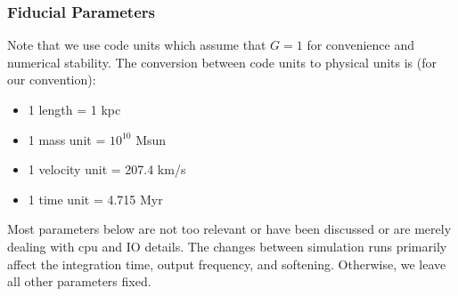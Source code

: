 \subsubsection{Fiducial Parameters}\label{fiducial-parameters}

Note that we use code units which assume that \(G=1\) for convenience
and numerical stability. The conversion between code units to physical
units is (for our convention):

\begin{itemize}
\tightlist
\item
  1 length = 1 kpc
\item
  1 mass unit = \(10^{10}\) Msun
\item
  1 velocity unit = 207.4 km/s
\item
  1 time unit = 4.715 Myr
\end{itemize}

Most parameters below are not too relevant or have been discussed or are
merely dealing with cpu and IO details. The changes between simulation
runs primarily affect the integration time, output frequency, and
softening. Otherwise, we leave all other parameters fixed.

